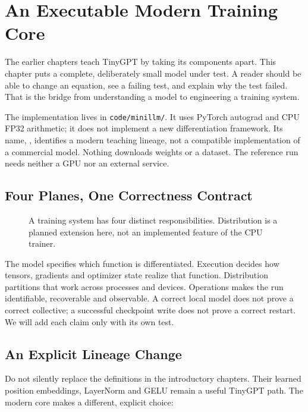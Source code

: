 \chapter{An Executable Modern Training Core}
\label{ch:modern-core}

The earlier chapters teach TinyGPT by taking its components apart. This chapter
puts a complete, deliberately small model under test. A reader should be able to
change an equation, see a failing test, and explain why the test failed. That is
the bridge from understanding a model to engineering a training system.

The implementation lives in \texttt{code/minillm/}. It uses PyTorch autograd and
CPU FP32 arithmetic; it does not implement a new differentiation framework.
Its name, , identifies a modern teaching lineage, not a compatible
implementation of a commercial model. Nothing downloads weights or a dataset.
The reference run needs neither a GPU nor an external service.

\section{Four Planes, One Correctness Contract}

\begin{figure}[htbp]\centering

\caption{A training system has four distinct responsibilities. Distribution is
a planned extension here, not an implemented feature of the CPU trainer.}
\label{fig:training-planes}
\end{figure}

The model specifies which function is differentiated. Execution decides how
tensors, gradients and optimizer state realize that function. Distribution
partitions that work across processes and devices. Operations makes the run
identifiable, recoverable and observable. A correct local model does not prove
a correct collective; a successful checkpoint write does not prove a correct
restart. We will add each claim only with its own test.

\section{An Explicit Lineage Change}

Do not silently replace the definitions in the introductory chapters. Their
learned position embeddings, LayerNorm and GELU remain a useful TinyGPT path.
The modern core makes a different, explicit choice:

